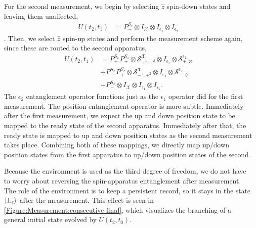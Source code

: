 For the second measurement, we begin by selecting $\hat{z}$ spin-down states and leaving them unaffected,
\begin{align}
  U(t_2, t_1) &=  P^{S_z}_- \otimes I_\mathcal{X} \otimes I_{\epsilon_1} \otimes I_{\epsilon_2}
\end{align}.
Then, we select $\hat{z}$ spin-up states and perform the measurement scheme again, since these are routed to the second apparatus,
\begin{align}
  U(t_2, t_1) &= P^{S_x}_+ P^{S_z}_+ \otimes \mathcal{S}^\mathcal{X}_{+^1, +^2} \otimes I_{\epsilon_1} \otimes \mathcal{S}^{\epsilon_2}_{+, \varnothing} \\ \nonumber
  &+ P^{S_x}_- P^{S_z}_+ \otimes \mathcal{S}^\mathcal{X}_{-^1, +^2} \otimes I_{\epsilon_1} \otimes \mathcal{S}^{\epsilon_2}_{-, \varnothing} \\ \nonumber
  &+ P^{S_z}_- \otimes I_\mathcal{X} \otimes I_{\epsilon_1} \otimes I_{\epsilon_2}.
\end{align}
The $\epsilon_2$ entanglement operator functions just as the $\epsilon_1$ operator did for the first measurement. The position entanglement operator is more subtle. Immediately after the first measurement, we expect the up and down position state to be mapped to the ready state of the second apparatus. Immediately after that, the ready state is mapped to up and down position states as the second measurement takes place. Combining both of these mappings, we directly map up/down position states from the first apparatus to up/down position states of the second.

Because the environment is used as the third degree of freedom, we do not have to worry about reversing the spin-apparatus entanglement after measurement. The role of the environment is to keep a persistent record, so it stays in the state $\ket{\pm_\epsilon}$ after the measurement. This effect is seen in \autoref{Figure:Measurement:consecutive final}, which visualizes the branching of a general initial state evolved by $U(t_2, t_0)$.

